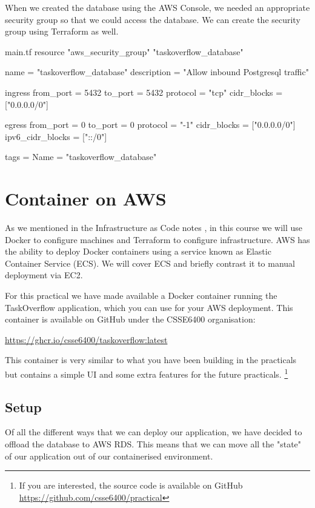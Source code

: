 \documentclass{csse4400}
\begin{document}
When we created the database using the AWS Console,
we needed an appropriate security group so that we could access the database.
We can create the security group using Terraform as well.

\begin{code}[language=terraform,numbers=none]{main.tf}
resource "aws_security_group" "taskoverflow_database" {
  name        = "taskoverflow_database"
  description = "Allow inbound Postgresql traffic"

  ingress {
    from_port        = 5432
    to_port          = 5432
    protocol         = "tcp"
    cidr_blocks      = ["0.0.0.0/0"]
  }

  egress {
    from_port        = 0
    to_port          = 0
    protocol         = "-1"
    cidr_blocks      = ["0.0.0.0/0"]
    ipv6_cidr_blocks = ["::/0"]
  }

  tags = {
    Name = "taskoverflow_database"
  }
}
\end{code}


\section{Container on AWS}

As we mentioned in the Infrastructure as Code notes \cite{iac-notes},
in this course we will use Docker to configure machines and Terraform to configure infrastructure.
AWS has the ability to deploy Docker containers using a service known as Elastic Container Service (ECS).
We will cover ECS and briefly contrast it to manual deployment via EC2.

For this practical we have made available a Docker container running the TaskOverflow application,
which you can use for your AWS deployment.
This container is available on GitHub under the CSSE6400 organisation:

\url{https://ghcr.io/csse6400/taskoverflow:latest}

This container is very similar to what you have been building in the practicals but contains a simple UI and some extra features for the future practicals.%
\footnote{If you are interested, the source code is available on GitHub \url{https://github.com/csse6400/practical}}

\subsection{Setup}

Of all the different ways that we can deploy our application, we have decided to offload the database to AWS RDS.
This means that we can move all the "state" of our application out of our containerised environment.
\end{document}
